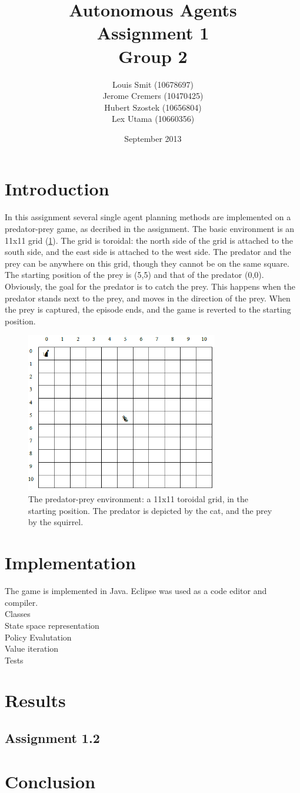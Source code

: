 \documentclass{article}
\title{Autonomous Agents \\ Assignment 1 \\ Group 2}
\author{Louis Smit (10678697) \\ Jerome Cremers (10470425) \\
Hubert Szostek (10656804) \\ Lex Utama (10660356)}
\date{September 2013}
\begin{document}
\maketitle

\section{Introduction}
In this assignment several single agent planning methods are implemented on a predator-prey game, as decribed in the assignment. The basic environment is an 11x11 grid (\ref{Grid}). The grid is
toroidal: the north side of the grid is attached to the south side, and the east side is attached to the west side. The predator and the prey can be anywhere on this grid, though they cannot be on the same square. The starting position of the prey is (5,5) and that of the predator (0,0).\\
Obviously, the goal for the predator is to catch the prey. This happens when the predator stands next to the prey, and moves in the direction of the prey. When the prey is captured, the episode ends, and the game is reverted to the starting position.

\begin{figure}[hb]
  \centering
  \includegraphics[width=3.3in]{Grid_world}
  \caption[Figure 1]
   {The predator-prey environment: a 11x11 toroidal grid, in the starting position. The predator is depicted by the cat, and the prey by the squirrel.}
   \label{Grid}
\end{figure}


\section{Implementation}
The game is implemented in Java. Eclipse was used as a code editor and compiler. \\
Classes\\
State space representation\\
Policy Evalutation\\
Value iteration\\
Tests\\

\section{Results}

\subsection{Assignment 1.2}


\section{Conclusion}
\end{document}
